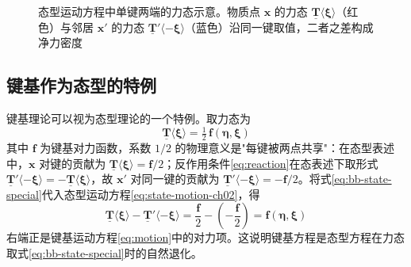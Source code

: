 \begin{figure}[htbp]
  \centering
  \caption{态型运动方程中单键两端的力态示意。物质点 $\mathbf{x}$ 的力态 $\underline{\mathbf{T}}\langle\boldsymbol{\xi}\rangle$（红色）与邻居 $\mathbf{x}'$ 的力态 $\underline{\mathbf{T}}'\langle-\boldsymbol{\xi}\rangle$（蓝色）沿同一键取值，二者之差构成净力密度 \cite{Silling2007}}
  \label{fig:net-force-density}
\end{figure}

\subsection{键基作为态型的特例}

键基理论可以视为态型理论的一个特例。取力态为
\begin{equation}
  \underline{\mathbf{T}}\langle\boldsymbol{\xi}\rangle=\tfrac{1}{2}\,\mathbf{f}(\boldsymbol{\eta},\boldsymbol{\xi})
  \label{eq:bb-state-special}
\end{equation}
其中 $\mathbf{f}$ 为键基对力函数，系数 $1/2$ 的物理意义是"每键被两点共享"：在态型表述中，$\mathbf{x}$ 对键的贡献为 $\underline{\mathbf{T}}\langle\boldsymbol{\xi}\rangle=\mathbf{f}/2$；反作用条件\eqref{eq:reaction}在态表述下取形式 $\underline{\mathbf{T}}'\langle-\boldsymbol{\xi}\rangle=-\underline{\mathbf{T}}\langle\boldsymbol{\xi}\rangle$，故 $\mathbf{x}'$ 对同一键的贡献为 $\underline{\mathbf{T}}'\langle-\boldsymbol{\xi}\rangle=-\mathbf{f}/2$。将式\eqref{eq:bb-state-special}代入态型运动方程\eqref{eq:state-motion-ch02}，得
\[
  \underline{\mathbf{T}}\langle\boldsymbol{\xi}\rangle-\underline{\mathbf{T}}'\langle-\boldsymbol{\xi}\rangle
  =\frac{\mathbf{f}}{2}-\left(-\frac{\mathbf{f}}{2}\right)
  =\mathbf{f}(\boldsymbol{\eta},\boldsymbol{\xi})
\]
右端正是键基运动方程\eqref{eq:motion}中的对力项。这说明键基方程是态型方程在力态取式\eqref{eq:bb-state-special}时的自然退化。

